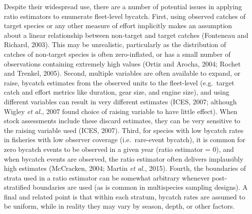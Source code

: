 \documentclass[]{article}
\begin{document}
Despite their widespread use, there are a number of potential issues in
applying ratio estimators to enumerate fleet-level bycatch. First, using
observed catches of target species or any other measure of effort
implicitly makes an assumption about a linear relationship between
non-target and target catches (Fonteneau and Richard, 2003). This may be
unrealistic, particularly as the distribution of catches of non-target
species is often zero-inflated, or has a small number of observations
containing extremely high values (Ortiz and Arocha, 2004; Rochet and
Trenkel, 2005). Second, multiple variables are often available to
expand, or raise, bycatch estimates from the observed units to the
fleet-level (e.g.~target catch and effort metrics like duration, gear
size, and engine size), and using different variables can result in very
different estimates (ICES, 2007; although Wigley \emph{et al.}, 2007
found choice of raising variable to have little effect). When stock
assessments include these discard estimates, they can be very sensitive
to the raising variable used (ICES, 2007). Third, for species with low
bycatch rates in fisheries with low observer coverage (i.e.~rare-event
bycatch), it is common for zero bycatch events to be observed in a given
year (ratio estimator = 0), and when bycatch events are observed, the
ratio estimator often delivers implausibly high estimates (McCracken,
2004; Martin \emph{et al.}, 2015). Fourth, the boundaries of strata used
in a ratio estimator can be somewhat arbitrary whenever post-stratified
boundaries are used (as is common in multispecies sampling designs). A
final and related point is that within each stratum, bycatch rates are
assumed to be uniform, while in reality they may vary by season, depth,
or other factors.
\end{document}
